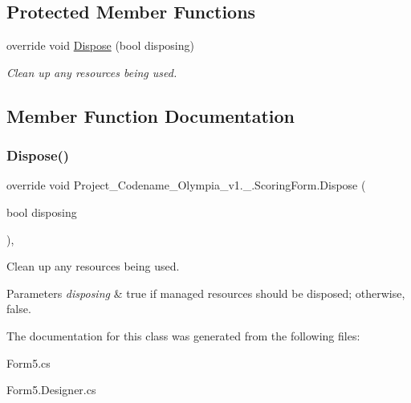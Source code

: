 \subsection*{Protected Member Functions}
\begin{DoxyCompactItemize}
\item 
override void \hyperlink{classProject__Codename__Olympia__v1_1_1__0_1_1ScoringForm_a6617b54014c935162ab2dd0746a3888e}{Dispose} (bool disposing)
\begin{DoxyCompactList}\small\item\em Clean up any resources being used. \end{DoxyCompactList}\end{DoxyCompactItemize}


\subsection{Member Function Documentation}
\mbox{\label{classProject__Codename__Olympia__v1_1_1__0_1_1ScoringForm_a6617b54014c935162ab2dd0746a3888e}} 
\subsubsection{\texorpdfstring{Dispose()}{Dispose()}}
{\footnotesize\ttfamily override void Project\+\_\+\+Codename\+\_\+\+Olympia\+\_\+v1.\+\_.\+Scoring\+Form.\+Dispose (\begin{DoxyParamCaption}\item[{bool}]{disposing }\end{DoxyParamCaption})\hspace{0.3cm}{\ttfamily [inline]}, {\ttfamily [protected]}}



Clean up any resources being used. 


\begin{DoxyParams}{Parameters}
{\em disposing} & true if managed resources should be disposed; otherwise, false.\\
\hline
\end{DoxyParams}


The documentation for this class was generated from the following files\+:\begin{DoxyCompactItemize}
\item 
Form5.\+cs\item 
Form5.\+Designer.\+cs\end{DoxyCompactItemize}
